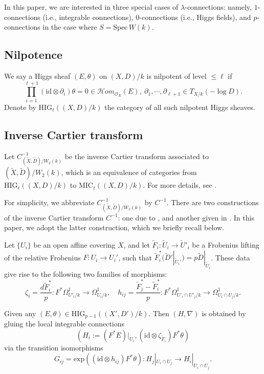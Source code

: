 \documentclass[12pt, a4paper]{article}
\begin{document}
In this paper, we are interested in three special cases of $\lambda$-connections: namely, $1$-connections (i.e., integrable connections), $0$-connections (i.e., Higgs fields), and $p$-connections in the case where $S = \mathrm{Spec}\, W(k)$.


\subsection{Nilpotence}


 We say a Higgs sheaf $(E,\theta)$ on $(X,D)/k$ is nilpotent of level $\leq\ell$ if
$$
\prod_{i=1}^{\ell+1}(\mathrm{id}\otimes\partial_i)\theta=0\in\mathcal Hom_{\mathcal O_X}(E),~\partial_1,\cdots,\partial_{\ell+1}\in T_{X/k}(-\log D).
$$
Denote by $\mathrm{HIG}_\ell((X,D)/k)$ the category of all such nilpotent Higgs sheaves. 

\subsection{Inverse Cartier transform}
Let $C^{-1}_{(\tilde X,\tilde D)/W_2(k)}$ be the inverse Cartier transform associated to $(\tilde X,\tilde D)/W_2(k)$, which is an equivalence of categories from $\mathrm{HIG}_\ell((X,D)/k)$ to $\mathrm{MIC}_\ell((X,D)/k)$. For more details, see \cite{OV, Schepler, LSYZ, LSZ}.

For simplicity, we abbreviate \( C^{-1}_{(\widetilde{X}, \widetilde{D})/W_2(k)} \) by \( C^{-1} \). There are two constructions of the inverse Cartier transform \( C^{-1} \): one due to \cite{OV, Schepler}, and another given in \cite{Fa, LSYZ, LSZ}. In this paper, we adopt the latter construction, which we briefly recall below.

Let $\{U_i\}$ be an open affine covering $X$, and let $\tilde F_i:\tilde U_i\to\tilde U'_i$ be a Frobenius lifting of the relative Frobenius $F: U_i\to U_i'$, such that $\tilde F_i^*(\tilde D'|_{\tilde U_i'})=p\tilde D|_{\tilde U_i}$. These data give rise to the following two families of morphisms:
$$
\zeta_i=\frac{d\tilde F^*_i}{p}:F^*\Omega^1_{U'_i/k}\to \Omega^1_{U_i/k},\quad h_{ij}=\frac{\tilde F^*_j-\tilde F^*_i}{p}:F^*\Omega^1_{U'_i\cap U'_j/k}\to\Omega^1_{U_i\cap U_j/k}.
$$

Given any $(E,\theta)\in\mathrm{HIG}_{p-1}((X',D')/k)$. Then $(H,\nabla)$ is obtained by gluing the local integrable connections
$$
(H_i:=(F^*E)|_{U_i},(\mathrm{id}\otimes\zeta_{\tilde F_i})F^*\theta)
$$
via the transition isomorphisms
$$
G_{ij}=\mathrm{exp}((\mathrm{id}\otimes h_{ij})F^*\theta):H_j|_{U_i\cap U_j}\to H_i|_{U_i\cap U_j}.$$
\end{document}

